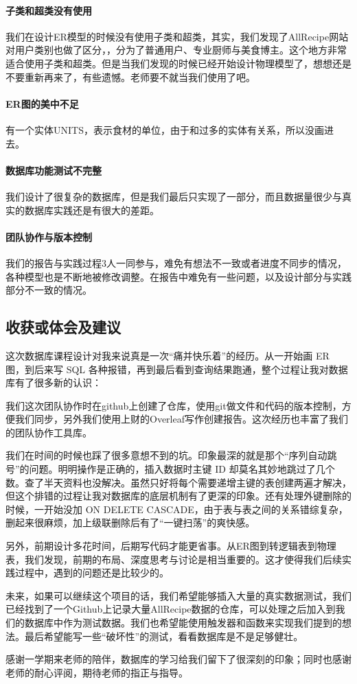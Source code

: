 \documentclass[11pt,a4paper]{article}
\renewcommand{\_}{\origunderscore\allowbreak}
\begin{document}
\paragraph{子类和超类没有使用}

我们在设计ER模型的时候没有使用子类和超类，其实，我们发现了AllRecipe网站对用户类别也做了区分，，分为了普通用户、专业厨师与美食博主。这个地方非常适合使用子类和超类。但是当我们发现的时候已经开始设计物理模型了，想想还是不要重新再来了，有些遗憾。老师要不就当我们使用了吧。

\paragraph{ER图的美中不足}

有一个实体UNITS，表示食材的单位，由于和过多的实体有关系，所以没画进去。

\paragraph{数据库功能测试不完整}

我们设计了很复杂的数据库，但是我们最后只实现了一部分，而且数据量很少与真实的数据库实践还是有很大的差距。

\paragraph{团队协作与版本控制}

我们的报告与实践过程3人一同参与，难免有想法不一致或者进度不同步的情况，各种模型也是不断地被修改调整。在报告中难免有一些问题，以及设计部分与实践部分不一致的情况。

\subsection{收获或体会及建议}

这次数据库课程设计对我来说真是一次“痛并快乐着”的经历。从一开始画 ER 图，到后来写 SQL 各种报错，再到最后看到查询结果跑通，整个过程让我对数据库有了很多新的认识：

我们这次团队协作时在github上创建了仓库，使用git做文件和代码的版本控制，方便我们同步，另外我们使用上财的Overleaf写作创建报告。这次经历也丰富了我们的团队协作工具库。

我们在时间的时候也踩了很多意想不到的坑。印象最深的就是那个“序列自动跳号”的问题。明明操作是正确的，插入数据时主键 ID 却莫名其妙地跳过了几个数。查了半天资料也没解决。虽然只好将每个需要递增主键的表创建两遍才解决，但这个排错的过程让我对数据库的底层机制有了更深的印象。还有处理外键删除的时候，一开始没加 ON DELETE CASCADE，由于表与表之间的关系错综复杂，删起来很麻烦，加上级联删除后有了“一键扫荡”的爽快感。

另外，前期设计多花时间，后期写代码才能更省事。从ER图到转逻辑表到物理表，我们发现，前期的布局、深度思考与讨论是相当重要的。这才使得我们后续实践过程中，遇到的问题还是比较少的。

未来，如果可以继续这个项目的话，我们希望能够插入大量的真实数据测试，我们已经找到了一个Github上记录大量AllRecipe数据的仓库，可以处理之后加入到我们的数据库中作为测试数据。我们也希望能使用触发器和函数来实现我们提到的想法。最后希望能写一些“破坏性”的测试，看看数据库是不是足够健壮。

感谢一学期来老师的陪伴，数据库的学习给我们留下了很深刻的印象；同时也感谢老师的耐心评阅，期待老师的指正与指导。
\end{document}
